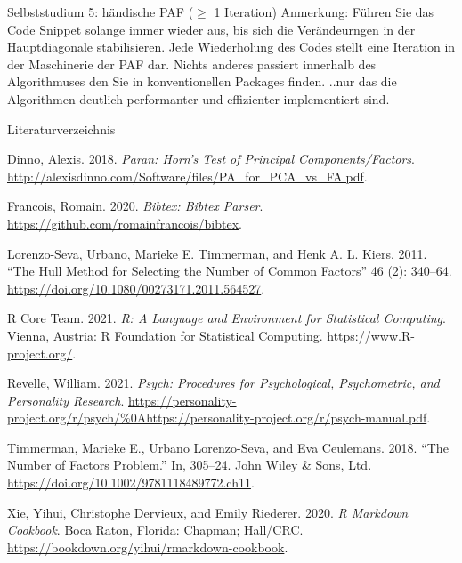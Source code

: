 \documentclass[
  ignorenonframetext,
]{beamer}
\newlength{\cslhangindent}
\newlength{\cslentryspacingunit} %
\newenvironment{CSLReferences}[2] %
 {%
  \setlength{\parindent}{0pt}
  \ifodd #1
  \let\oldpar\par
  \def\par{\hangindent=\cslhangindent\oldpar}
  \fi
  \setlength{\parskip}{#2\cslentryspacingunit}
 }%
 {}
\begin{document}
\begin{frame}{Selbststudium 5: händische PAF (\(\geq\) 1 Iteration)}
\protect\hypertarget{selbststudium-5-huxe4ndische-paf-geq-1-iteration}{}
Anmerkung: Führen Sie das Code Snippet solange immer wieder aus, bis
sich die Verändeurngen in der Hauptdiagonale stabilisieren. Jede
Wiederholung des Codes stellt eine Iteration in der Maschinerie der PAF
dar. Nichts anderes passiert innerhalb des Algorithmuses den Sie in
konventionellen Packages finden. ..nur das die Algorithmen deutlich
performanter und effizienter implementiert sind.
\end{frame}

\begin{frame}[allowframebreaks]{Literaturverzeichnis}
\protect\hypertarget{literaturverzeichnis}{}
~

\hypertarget{refs}{}
\begin{CSLReferences}{1}{0}
\leavevmode{}%
Dinno, Alexis. 2018. \emph{Paran: Horn's Test of Principal
Components/Factors}.
\url{http://alexisdinno.com/Software/files/PA_for_PCA_vs_FA.pdf}.

\leavevmode{}%
Francois, Romain. 2020. \emph{Bibtex: Bibtex Parser}.
\url{https://github.com/romainfrancois/bibtex}.

\leavevmode{}%
Lorenzo-Seva, Urbano, Marieke E. Timmerman, and Henk A. L. Kiers. 2011.
{``The Hull Method for Selecting the Number of Common Factors''} 46 (2):
340--64. \url{https://doi.org/10.1080/00273171.2011.564527}.

\leavevmode{}%
R Core Team. 2021. \emph{R: A Language and Environment for Statistical
Computing}. Vienna, Austria: R Foundation for Statistical Computing.
\url{https://www.R-project.org/}.

\leavevmode{}%
Revelle, William. 2021. \emph{Psych: Procedures for Psychological,
Psychometric, and Personality Research}.
\url{https://personality-project.org/r/psych/\%0Ahttps://personality-project.org/r/psych-manual.pdf}.

\leavevmode{}%
Timmerman, Marieke E., Urbano Lorenzo-Seva, and Eva Ceulemans. 2018.
{``The Number of Factors Problem.''} In, 305--24. John Wiley {\&} Sons,
Ltd. \url{https://doi.org/10.1002/9781118489772.ch11}.

\leavevmode{}%
Xie, Yihui, Christophe Dervieux, and Emily Riederer. 2020. \emph{R
Markdown Cookbook}. Boca Raton, Florida: Chapman; Hall/CRC.
\url{https://bookdown.org/yihui/rmarkdown-cookbook}.

\end{CSLReferences}
\end{frame}
\end{document}
